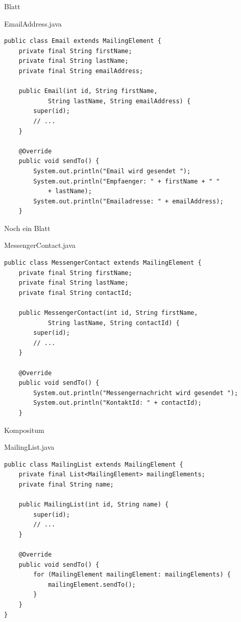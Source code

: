 \begin{frame}[fragile]{Blatt}
	\begin{exampleblock}{EmailAddress.java}
        \begin{lstlisting}
public class Email extends MailingElement {
	private final String firstName;
	private final String lastName;
	private final String emailAddress;
	
	public Email(int id, String firstName, 
            String lastName, String emailAddress) {
		super(id);
        // ...
	}
	
	@Override
	public void sendTo() {
		System.out.println("Email wird gesendet ");
		System.out.println("Empfaenger: " + firstName + " " 
            + lastName);
		System.out.println("Emailadresse: " + emailAddress);
	}            
        \end{lstlisting}
 	\end{exampleblock}
\end{frame}

\begin{frame}[fragile]{Noch ein Blatt}
	\begin{exampleblock}{MessengerContact.java}
        \begin{lstlisting}
public class MessengerContact extends MailingElement {
	private final String firstName;
	private final String lastName;
	private final String contactId;
	
	public MessengerContact(int id, String firstName, 
            String lastName, String contactId) {
		super(id);
		// ...
	}
	
	@Override
	public void sendTo() {
		System.out.println("Messengernachricht wird gesendet ");
		System.out.println("KontaktId: " + contactId);
	}            
        \end{lstlisting}
 	\end{exampleblock}
\end{frame}

\begin{frame}[fragile]{Kompositum}
	\begin{exampleblock}{MailingList.java}
        \begin{lstlisting}
public class MailingList extends MailingElement {
	private final List<MailingElement> mailingElements;
	private final String name;
	
	public MailingList(int id, String name) {
		super(id);
        // ...
	}
	
	@Override
	public void sendTo() {
		for (MailingElement mailingElement: mailingElements) {
			mailingElement.sendTo();
		}
	}
}            
        \end{lstlisting}
 	\end{exampleblock}
\end{frame}

